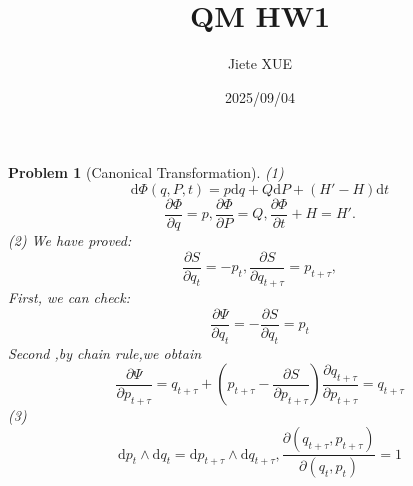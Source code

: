 \documentclass{article}
\title{QM HW1}
\author{Jiete XUE}
\date{2025/09/04}
\theoremstyle{t}
\newtheorem{problem}{Problem}
\newcommand{\dd}{\mathrm{d}}
\begin{document}
\maketitle
\begin{problem}[Canonical Transformation]
(1)\begin{equation}
   \dd \Phi(q,P,t)=p\dd q+Q\dd P+(H'-H)\dd t 
\end{equation}
\begin{equation}
    \frac{\partial \Phi}{\partial q}=p,\frac{\partial \Phi}{\partial P}=Q,\frac{\partial \Phi}{\partial t}+H=H'.
\end{equation}
(2) We have proved:
\begin{equation}
    \frac{\partial S}{\partial q_t}=-p_t,\frac{\partial S}{\partial q_{t+\tau}}=p_{t+\tau},
\end{equation}
First, we can check:
\begin{equation}
    \frac{\partial \Psi}{\partial q_t}=-\frac{\partial S}{\partial q_t}=p_t
\end{equation}
Second ,by chain rule,we obtain
\begin{equation}
    \frac{\partial \Psi }{\partial p_{t+\tau}}=q_{t+\tau}+\left( p_{t+\tau}-\frac{\partial S}{\partial p_{t+\tau}}\right)\frac{\partial q_{t+\tau}}{\partial p_{t+\tau}}=q_{t+\tau}
\end{equation}
(3) \begin{equation}
    \dd p_t\wedge\dd q_t=\dd p_{t+\tau}\wedge\dd q_{t+\tau},\frac{\partial(q_{t+\tau},p_{t+\tau})}{\partial(q_t,p_t)}=1
\end{equation}
\end{problem}
\end{document}
